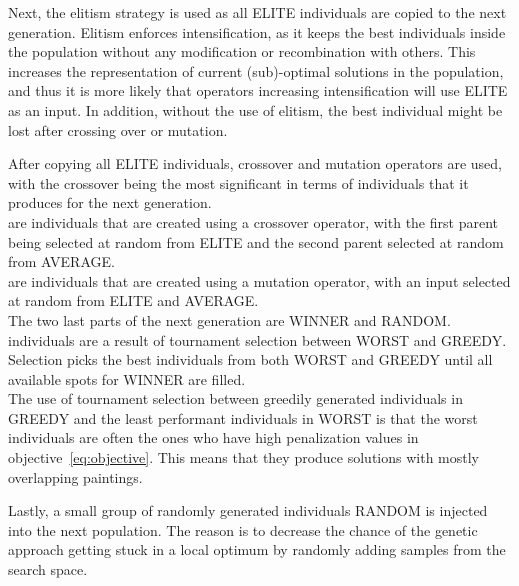 Next, the elitism strategy is used as all ELITE individuals are copied to the next generation.
Elitism enforces intensification, as it keeps the best individuals inside the population without any
modification or recombination with others.
This increases the representation of current (sub)-optimal solutions in the population, and thus it is more likely that operators increasing intensification will use ELITE as an input.
In addition, without the use of elitism, the best individual might be lost after crossing over or mutation.

After copying all ELITE individuals, crossover and mutation operators are used, with the crossover being
the most significant in terms of individuals that it produces for the next generation.\\

 are individuals that are created using a crossover operator, with the first parent being selected
at random from ELITE and the second parent selected at random from AVERAGE.\\

 are individuals that are created using a mutation operator,
with an input selected at random from ELITE and AVERAGE.\\

The two last parts of the next generation are WINNER and RANDOM.\\

 individuals are a result of tournament selection between WORST and GREEDY.
Selection picks the best individuals from both WORST and GREEDY until all available spots for WINNER are filled. \\

The use of tournament selection between greedily generated individuals in GREEDY and the least performant
individuals in WORST is that the worst individuals are often the ones who have high penalization
values in objective~\ref{eq:objective}.
This means that they produce solutions with mostly overlapping paintings.

Lastly, a small group of randomly generated individuals RANDOM is injected into the next population.
The reason is to decrease the chance of the genetic approach getting stuck in a local optimum
by randomly adding samples from the search space.


